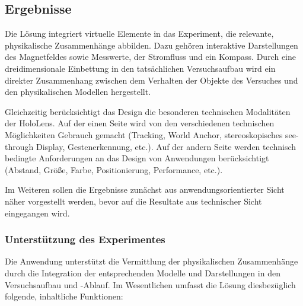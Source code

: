 \subsection{Ergebnisse}
 Die Lösung integriert virtuelle Elemente in das Experiment, die relevante, physikalische Zusammenhänge abbilden. Dazu gehören interaktive Darstellungen des Magnetfeldes sowie Messwerte, der Stromfluss und ein Kompass. Durch eine dreidimensionale Einbettung in den tatsächlichen Versuchsaufbau wird ein direkter Zusammenhang zwischen dem Verhalten der Objekte des Versuches und den physikalischen Modellen hergestellt.
 \par
 \noindent\hspace*{5mm}
 Gleichzeitig berücksichtigt das Design die besonderen technischen Modalitäten der HoloLens. Auf der einen Seite wird von den verschiedenen technischen Möglichkeiten Gebrauch gemacht (Tracking, World Anchor, stereoskopisches see-through Display, Gestenerkennung, etc.). Auf der andern Seite werden technisch bedingte Anforderungen an das Design von Anwendungen berücksichtigt (Abstand, Größe, Farbe, Positionierung, Performance, etc.).
 \par
 \noindent\hspace*{5mm}
 Im Weiteren sollen die Ergebnisse zunächst aus anwendungsorientierter Sicht näher vorgestellt werden, bevor auf die Resultate aus technischer Sicht eingegangen wird.
 
\subsubsection{Unterstützung des Experimentes}
Die Anwendung unterstützt die Vermittlung der physikalischen Zusammenhänge durch die Integration der entsprechenden Modelle und Darstellungen in den Versuchsaufbau und -Ablauf. Im Wesentlichen umfasst die Lösung diesbezüglich folgende, inhaltliche Funktionen:
\vspace{8px}
\begin{center}
	\\
\end{center}
\vspace{6px}

